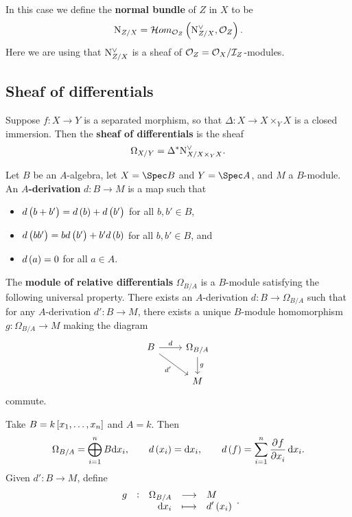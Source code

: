 In this case we define the \textbf{normal bundle} of $ Z $ in $ X $ to be
$$ \N_{Z / X} = \HOM_{\OOO_Z}\br{\N_{Z / X}^\vee, \OOO_Z}. $$
Here we are using that $ \mathrm{N}_{Z / X}^\vee $ is a sheaf of $ \mathcal{O}_Z = \mathcal{O}_X / \mathcal{I}_Z $-modules.

\subsection{Sheaf of differentials}

\begin{definition*}
Suppose $ f : X \to Y $ is a separated morphism, so that $ \Delta : X \to X \times_Y X $ is a closed immersion. Then the \textbf{sheaf of differentials} is the sheaf
$$ \Omega_{X / Y} = \Delta^*\mathrm{N}_{X / X \times_Y X}^\vee. $$
\end{definition*}


Let $ B $ be an $ A $-algebra, let $ X = \Spec B $ and $ Y = \Spec A $, and $ M $ a $ B $-module. An \textbf{$ A $-derivation} $ d : B \to M $ is a map such that
\begin{itemize}
\item $ d\br{b + b'} = d\br{b} + d\br{b'} $ for all $ b, b' \in B $,
\item $ d\br{bb'} = bd\br{b'} + b'd\br{b} $ for all $ b, b' \in B $, and
\item $ d\br{a} = 0 $ for all $ a \in A $.
\end{itemize}
The \textbf{module of relative differentials} $ \Omega_{B / A} $ is a $ B $-module satisfying the following universal property. There exists an $ A $-derivation $ d : B \to \Omega_{B / A} $ such that for any $ A $-derivation $ d' : B \to M $, there exists a unique $ B $-module homomorphism $ g : \Omega_{B / A} \to M $ making the diagram
$$
\begin{tikzcd}
B \arrow{r}{d} \arrow{dr}[swap]{d'} & \Omega_{B / A} \arrow{d}{g} \\
& M
\end{tikzcd}
$$
commute.

\begin{example*}
Take $ B = k\sbr{x_1, \dots, x_n} $ and $ A = k $. Then
$$ \Omega_{B / A} = \bigoplus_{i = 1}^n B\d x_i, \qquad d\br{x_i} = \d x_i, \qquad d\br{f} = \sum_{i = 1}^n \dpd{f}{x_i}\d x_i. $$
Given $ d' : B \to M $, define
$$ \function[g]{\Omega_{B / A}}{M}{\d x_i}{d'\br{x_i}}. $$
\end{example*}

\pagebreak


